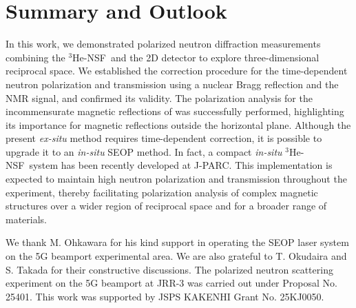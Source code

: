 \documentclass[%
 reprint,
superscriptaddress,
 amsmath,amssymb,
 aps,
floatfix,
]{revtex4-2}
\newcommand{\Hensf}{$^3$He-NSF}
\begin{document}
\section{Summary and Outlook}
In this work, we demonstrated polarized neutron diffraction measurements combining the \Hensf~and the 2D detector to explore three-dimensional reciprocal space.
We established the correction procedure for the time-dependent neutron polarization and transmission using a nuclear Bragg reflection and the NMR signal, and confirmed its validity.
The polarization analysis for the incommensurate magnetic reflections of  was successfully performed, highlighting its importance for magnetic reflections outside the horizontal plane.
Although the present \textit{ex-situ} method requires time-dependent correction, it is possible to upgrade it to an \textit{in-situ} SEOP method.
In fact, a compact \textit{in-situ} \Hensf~system has been recently developed at J-PARC\cite{takahashi_development_2025}.
This implementation is expected to maintain high neutron polarization and transmission throughout the experiment, thereby facilitating polarization analysis of complex magnetic structures over a wider region of reciprocal space and for a broader range of materials.

\begin{acknowledgments}
We thank M. Ohkawara for his kind support in operating the SEOP laser system on the 5G beamport experimental area.
We are also grateful to T. Okudaira and S. Takada for their constructive discussions.
The polarized neutron scattering experiment on the 5G beamport at JRR-3 was carried out under Proposal No. 25401.
This work was supported by JSPS KAKENHI Grant No. 25KJ0050.
\end{acknowledgments}

\appendix
\end{document}
